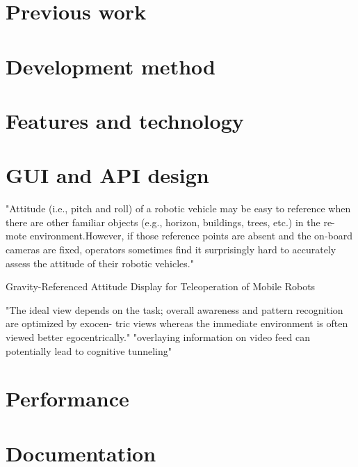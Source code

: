 \section{Previous work}
\section{Development method}
\section{Features and technology}
\section{GUI and API design}

\citep{Chen2007} "Attitude (i.e., pitch and roll) of a robotic vehicle may be easy to reference when there are other familiar objects (e.g., horizon, buildings, trees, etc.) in the re- mote environment.However, if those reference points are absent and the on-board cameras are fixed, operators sometimes find it surprisingly hard to accurately assess the attitude of their robotic vehicles."

\citep{Wang2004} Gravity-Referenced Attitude Display for Teleoperation of Mobile Robots

\citep{Chen2007} "The ideal view depends on the task; overall awareness and pattern recognition are optimized by exocen- tric views whereas the immediate environment is often viewed better egocentrically."
"overlaying information on video feed can potentially lead to cognitive tunneling"

\section{Performance}
\section{Documentation}